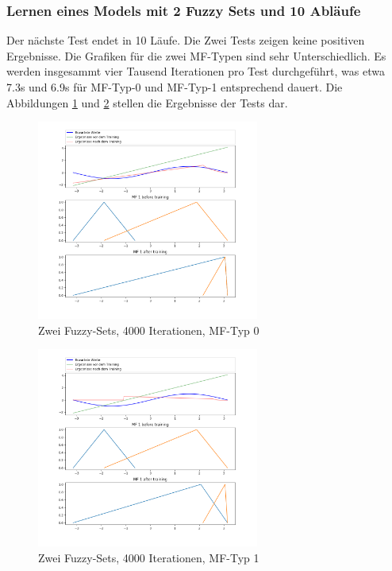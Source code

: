 \subsubsection{Lernen eines Models mit 2 Fuzzy Sets und 10 Abläufe}\label{m2fs10ab}

Der nächste Test endet in 10 Läufe. Die Zwei Tests zeigen keine positiven Ergebnisse. Die Grafiken für die zwei MF-Typen sind sehr Unterschiedlich. Es werden insgesammt vier Tausend Iterationen pro Test durchgeführt, was etwa 7.3s und 6.9s für MF-Typ-0 und MF-Typ-1 entsprechend dauert. Die Abbildungen \ref{2Sets4000_Stoch_0} und \ref{2Sets4000_Stoch_1} stellen die Ergebnisse der Tests dar.

\begin{figure}[htbp]
	\centering
	\includegraphics[width=0.65\textwidth]{images/sinus/Stochastic/sinus 1 Input 2 Sets 4000 Epochs Stochastic Gradient Descent two equations mf.png}
	\caption{Zwei Fuzzy-Sets, 4000 Iterationen, MF-Typ 0} \label{2Sets4000_Stoch_0}
\end{figure}
\begin{figure}[htbp]
	\centering
	\includegraphics[width=0.65\textwidth]{images/sinus/Stochastic/sinus 1 Input 2 Sets 4000 Epochs Stochastic Gradient Descent one equation mf.png}
	\caption{Zwei Fuzzy-Sets, 4000 Iterationen, MF-Typ 1} \label{2Sets4000_Stoch_1}
\end{figure}

